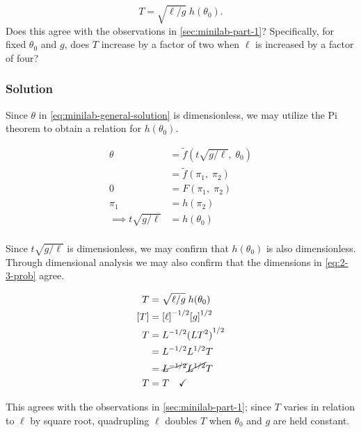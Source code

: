\documentclass[12pt]{article}
\begin{document}
  \begin{equation}
    \label{eq:2-3-prob}
    T=\sqrt{\ell/g}\;h(\theta_0).
  \end{equation}
  Does this agree with the observations in \cref{sec:minilab-part-1}?
  Specifically, for fixed $\theta_0$ and $g$, does $T$ increase by a factor of
  two when $\ell$ is increased by a factor of four?

  \subsubsection*{Solution}

  Since $\theta$ in \cref{eq:minilab-general-solution} is dimensionless, we may
  utilize the Pi theorem to obtain a relation for $h(\theta_0)$.

  \begin{equation}
    \begin{aligned}
      \theta &= \tilde{f}(t\sqrt{g/\ell},\;\theta_0) \\
      &= \tilde{f}(\pi_1,\;\pi_2) \\
      0 &= F(\pi_1,\;\pi_2) \\
      \pi_1 &= h(\pi_2) \\
      \implies t\sqrt{g/\ell} &= h(\theta_0) \\
    \end{aligned}
  \end{equation}

  Since $t\sqrt{g/\ell}$ is dimensionless, we may confirm that $h(\theta_0)$ is
  also dimensionless. Through dimensional analysis we may also confirm that the
  dimensions in \cref{eq:2-3-prob} agree.

  \begin{equation}
    \begin{aligned}
      T &= \sqrt{\ell/g}\;h(\theta_0) \\
      [T] &= {[\ell]}^{-1/2}{[g]}^{1/2} \\
      T &= L^{-1/2}{(LT^2)}^{1/2} \\
      &= L^{-1/2}L^{1/2}T \\
      &= \cancel{L^{-1/2}}\cancel{L^{1/2}}T \\
      T &= T \quad\checkmark
    \end{aligned}
  \end{equation}

  This agrees with the observations in \cref{sec:minilab-part-1}; since $T$
  varies in relation to $\ell$ by square root, quadrupling $\ell$ doubles $T$
  when $\theta_0$ and $g$ are held constant.
\end{document}
